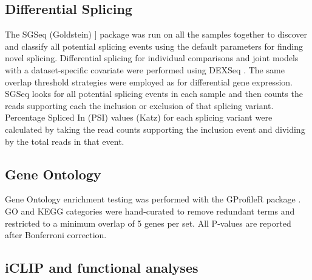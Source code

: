 \subsection{Differential Splicing}
The SGSeq (Goldstein) \citep{Goldstein2016}] package was run on all the samples together to discover and classify all potential splicing events using the default parameters for finding novel splicing. 
Differential splicing for individual comparisons and joint models with a dataset-specific covariate were performed using DEXSeq \cite{Anders2012}.
The same overlap threshold strategies were employed as for differential gene expression.
SGSeq looks for all potential splicing events in each sample and then counts the reads supporting each the inclusion or exclusion of that splicing variant. 
Percentage Spliced In (PSI) values (Katz) \citep{Katz2010-ir} for each splicing variant were calculated by taking the read counts supporting the inclusion event and dividing by the total reads in that event. 

\subsection{Gene Ontology}
Gene Ontology enrichment testing was performed with the GProfileR package \citep{Reimand2016}. 
GO and KEGG categories were hand-curated to remove redundant terms and restricted to a minimum overlap of 5 genes per set. 
All P-values  are reported after Bonferroni correction. 

\subsection{iCLIP and functional analyses}

